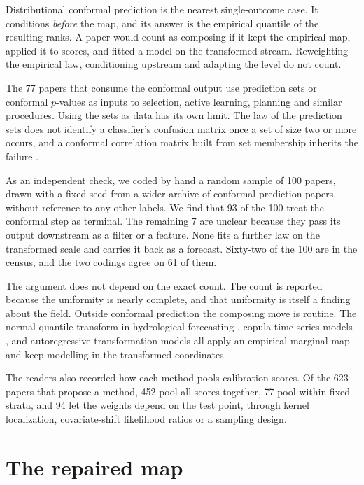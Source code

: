 \documentclass[11pt]{article}
\theoremstyle{remark}
\begin{document}
Distributional conformal prediction \citep{chernozhukov2021distributional} is the
nearest single-outcome case. It conditions \emph{before} the map, and its answer is
the empirical quantile of the resulting ranks. A paper would count as composing if it
kept the empirical map, applied it to scores, and fitted a model on the transformed
stream. Reweighting the empirical law, conditioning upstream and adapting the level
do not count.

The 77 papers that consume the conformal output use prediction sets or conformal
$p$-values as inputs to selection, active learning, planning and similar procedures. Using the sets as data
has its own limit. The law of the prediction sets does not identify a classifier's
confusion matrix once a set of size two or more occurs, and a conformal correlation
matrix built from set membership inherits the failure \citep{cotton2026correlation}.

As an independent check, we coded by hand a random sample of 100 papers, drawn with a
fixed seed from a wider archive of conformal prediction papers, without reference to
any other labels. We find that 93 of the 100 treat the conformal step as terminal. The
remaining 7 are unclear because they pass its output downstream as a filter or a
feature. None fits a further law on the transformed scale and carries it back as a
forecast. Sixty-two of the 100 are in the census, and the two codings agree on 61 of
them.

The argument does not depend on the exact count. The count is reported because the uniformity is nearly complete, and that uniformity is itself a finding about the field. Outside conformal prediction the composing move is routine. The normal quantile
transform in hydrological forecasting \citep{bogner2012}, copula time-series
models \citep{chenfan2006}, and autoregressive transformation models
\citep{rugamer2023} all apply an empirical marginal map and keep modelling in
the transformed coordinates.

The readers also recorded how each method pools calibration scores. Of the 623 papers
that propose a method, 452 pool all scores together, 77 pool within fixed strata, and
94 let the weights depend on the test point, through kernel localization,
covariate-shift likelihood ratios or a sampling design.


\section{The repaired map}\label{app:repair}
\end{document}
